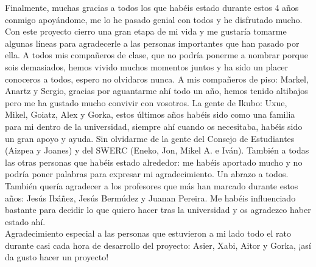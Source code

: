 Finalmente, muchas gracias a todos los que habéis estado durante estos 4 años conmigo apoyándome, me lo he pasado genial con todos y he disfrutado mucho. Con este proyecto cierro una gran etapa de mi vida y me gustaría tomarme algunas líneas para agradecerle a las personas importantes que han pasado por ella. A todos mis compañeros de clase, que no podría ponerme a nombrar porque sois demasiados, hemos vivido muchos momentos juntos y ha sido un placer conoceros a todos, espero no olvidaros nunca. A mis compañeros de piso: Markel, Anartz y Sergio, gracias por aguantarme ahí todo un año, hemos tenido altibajos pero me ha gustado mucho convivir con vosotros. La gente de Ikubo: Uxue, Mikel, Goiatz, Alex y Gorka, estos últimos años habéis sido como una familia para mi dentro de la universidad, siempre ahí cuando os necesitaba, habéis sido un gran apoyo y ayuda. Sin olvidarme de la gente del Consejo de Estudiantes (Aizpea y Joanes) y del SWERC (Eneko, Jon, Mikel A. e Iván). También a todas las otras personas que habéis estado alrededor: me habéis aportado mucho y no podría poner palabras para expresar mi agradecimiento. Un abrazo a todos.\\

También quería agradecer a los profesores que más han marcado durante estos años: Jesús Ibáñez, Jesús Bermúdez y Juanan Pereira. Me habéis influenciado bastante para decidir lo que quiero hacer tras la universidad y os agradezco haber estado ahí.\\

Agradecimiento especial a las personas que estuvieron a mi lado todo el rato durante casi cada hora de desarrollo del proyecto: Asier, Xabi, Aitor y Gorka, ¡así da gusto hacer un proyecto!\\
